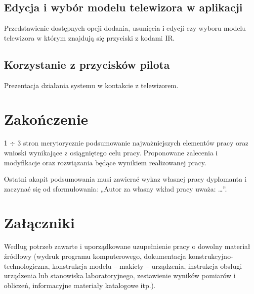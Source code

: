 \documentclass[12pt,twoside]{article}
\begin{document}
\subsection{Edycja i wybór modelu telewizora w aplikacji}
Przedstawienie dostępnych opcji dodania, usunięcia i edycji czy wyboru modelu telewizora w którym znajdują się przyciski z kodami IR.
\subsection{Korzystanie z przycisków pilota}
Prezentacja działania systemu w kontakcie z telewizorem.

\clearpage

\section{Zakończenie}

1 $\div$ 3 stron merytorycznie podsumowanie najważniejszych elementów pracy oraz wnioski wynikające z osiągniętego celu pracy. Proponowane zalecenia i modyfikacje oraz rozwiązania będące wynikiem realizowanej pracy.

Ostatni akapit podsumowania musi zawierać wykaz własnej pracy dyplomanta i zaczynać się od sformułowania: „Autor za własny wkład pracy uważa: \ldots”.

\clearpage

\section*{Załączniki}

Według potrzeb zawarte i uporządkowane uzupełnienie pracy o dowolny materiał źródłowy (wydruk programu komputerowego, dokumentacja kons\-truk\-cyj\-no-\-tech\-no\-lo\-gicz\-na, konstrukcja modelu -- makiety -- urządzenia, instrukcja obsługi urządzenia lub stanowiska laboratoryjnego, zestawienie wyników pomiarów i obliczeń, informacyjne materiały katalogowe itp.).


\clearpage


\begin{thebibliography}{4}
\end{thebibliography}

\clearpage

\makesummary
\end{document}
